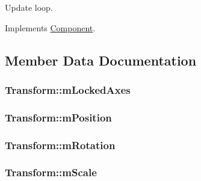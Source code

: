 Update loop. 



Implements \hyperlink{classComponent_abda56474d6ccfbdab47cb5e0cd595c2b}{Component}.



\subsection{Member Data Documentation}
\subsubsection[{\texorpdfstring{m\+Locked\+Axes}{mLockedAxes}}]{ Transform\+::m\+Locked\+Axes\hspace{0.3cm}{\ttfamily [private]}}\hypertarget{classTransform_ac8c97858398bf06f822728693374d301}{}\label{classTransform_ac8c97858398bf06f822728693374d301}
\subsubsection[{\texorpdfstring{m\+Position}{mPosition}}]{ Transform\+::m\+Position\hspace{0.3cm}{\ttfamily [private]}}\hypertarget{classTransform_a975e3ed410b66254086da111e258886c}{}\label{classTransform_a975e3ed410b66254086da111e258886c}
\subsubsection[{\texorpdfstring{m\+Rotation}{mRotation}}]{ Transform\+::m\+Rotation\hspace{0.3cm}{\ttfamily [private]}}\hypertarget{classTransform_af3d53ed29845812548669e5b52a47086}{}\label{classTransform_af3d53ed29845812548669e5b52a47086}
\subsubsection[{\texorpdfstring{m\+Scale}{mScale}}]{ Transform\+::m\+Scale\hspace{0.3cm}{\ttfamily [private]}}\hypertarget{classTransform_a102176b78b2592b281d66788c39433b7}{}\label{classTransform_a102176b78b2592b281d66788c39433b7}
